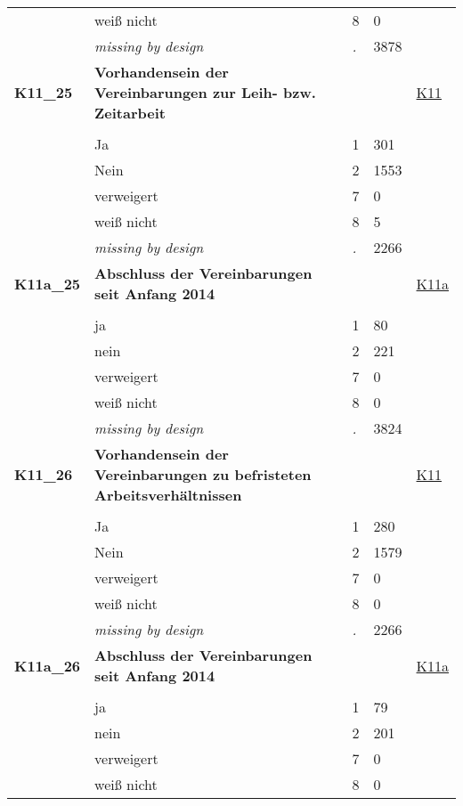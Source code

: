 \begin{longtable}{| L{2.65cm} | L{8cm} | C{1.5cm} | R{1.25cm} | C{2.25cm}  |}
   & weiß nicht & 8 & 0 &  \\ 
   & \textit{missing by design} & \textit{.} & 3878 &  \\ 
   \midrule
\textbf{K11\_25}\label{var:K11:25} & \textbf{Vorhandensein der Vereinbarungen zur Leih- bzw. Zeitarbeit} &  &  & \hyperref[K11]{K11} \\ 
   &  &  &  &  \\ 
   & Ja & 1 & 301 &  \\ 
   & Nein & 2 & 1553 &  \\ 
   & verweigert & 7 & 0 &  \\ 
   & weiß nicht & 8 & 5 &  \\ 
   & \textit{missing by design} & \textit{.} & 2266 &  \\ 
   \midrule
\textbf{K11a\_25}\label{var:K11a:25} & \textbf{Abschluss der Vereinbarungen seit Anfang 2014} &  &  & \hyperref[K11a]{K11a} \\ 
   &  &  &  &  \\ 
   & ja & 1 & 80 &  \\ 
   & nein & 2 & 221 &  \\ 
   & verweigert & 7 & 0 &  \\ 
   & weiß nicht & 8 & 0 &  \\ 
   & \textit{missing by design} & \textit{.} & 3824 &  \\ 
   \midrule
\textbf{K11\_26}\label{var:K11:26} & \textbf{Vorhandensein der Vereinbarungen zu befristeten Arbeitsverhältnissen} &  &  & \hyperref[K11]{K11} \\ 
   &  &  &  &  \\ 
   & Ja & 1 & 280 &  \\ 
   & Nein & 2 & 1579 &  \\ 
   & verweigert & 7 & 0 &  \\ 
   & weiß nicht & 8 & 0 &  \\ 
   & \textit{missing by design} & \textit{.} & 2266 &  \\ 
   \midrule
\textbf{K11a\_26}\label{var:K11a:26} & \textbf{Abschluss der Vereinbarungen seit Anfang 2014} &  &  & \hyperref[K11a]{K11a} \\ 
   &  &  &  &  \\ 
   & ja & 1 & 79 &  \\ 
   & nein & 2 & 201 &  \\ 
   & verweigert & 7 & 0 &  \\ 
   & weiß nicht & 8 & 0 &  \\ 

\end{longtable}
